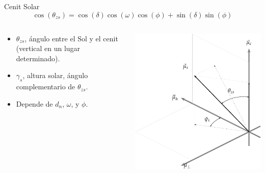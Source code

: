 \documentclass[xcolor={usenames,svgnames,dvipsnames}]{beamer}
\begin{document}
\begin{frame}[plain,label={sec:org54352f8}]{Cenit Solar}
\[
\cos(\theta_{zs}) = \cos(\delta) \cos(\omega) \cos(\phi) + \sin(\delta) \sin(\phi)
\]

\begin{columns}
\begin{column}{0.55\columnwidth}
\begin{itemize}
\item \(\theta_{zs}\), ángulo entre el Sol y el cenit (vertical en un lugar determinado).
\item \(\gamma_s\), altura solar, ángulo complementario de \(\theta_{zs}\).
\item Depende de \(d_n\), \(\omega\), y \(\phi\).
\end{itemize}
\end{column}
\begin{column}{0.75\columnwidth}
\begin{center}
\includegraphics[width=.9\linewidth]{../figs/SistemaCoordenadasLocal-crop.pdf}
\end{center}
\end{column}
\end{columns}
\end{frame}
\end{document}
